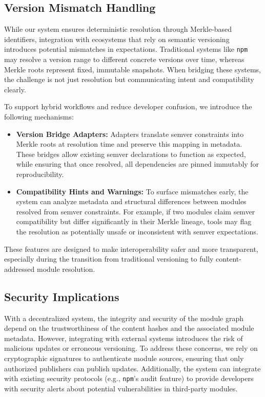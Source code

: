 \documentclass[sigplan,screen]{acmart}
\begin{document}
\subsection{Version Mismatch Handling}
\label{sec:version-mismatch}

While our system ensures deterministic resolution thr\-ough Merkle-based identifiers, integration with ecosystems that rely on semantic versioning introduces potential mismatches in expectations. Traditional systems like \texttt{npm} may resolve a version range to different concrete versions over time, whereas Merkle roots represent fixed, immutable snapshots. When bridging these systems, the challenge is not just resolution but communicating intent and compatibility clearly.

To support hybrid workflows and reduce developer confusion, we introduce the following mechanisms:

\begin{itemize}
  \item \textbf{Version Bridge Adapters:} Adapters translate semver constraints into Merkle roots at resolution time and preserve this mapping in metadata. These bridges allow existing semver declarations to function as expected, while ensuring that once resolved, all dependencies are pinned immutably for reproducibility.

  \item \textbf{Compatibility Hints and Warnings:} To surface mismatches early, the system can analyze metadata and structural differences between modules resolved from semver constraints. For example, if two modules claim semver compatibility but differ significantly in their Merkle lineage, tools may flag the resolution as potentially unsafe or inconsistent with semver expectations.
\end{itemize}

These features are designed to make interoperability safer and more transparent, especially during the transition from traditional versioning to fully content-addressed module resolution.

\subsection{Security Implications}

With a decentralized system, the integrity and security of the module graph depend on the trustworthiness of the content hashes and the associated module metadata. However, integrating with external systems introduces the risk of malicious updates or erroneous versioning. To address these concerns, we rely on cryptographic signatures to authenticate module sources, ensuring that only authorized publishers can publish updates. Additionally, the system can integrate with existing security protocols (e.g., \texttt{npm}'s audit feature) to provide developers with security alerts about potential vulnerabilities in third-party modules.
\end{document}
